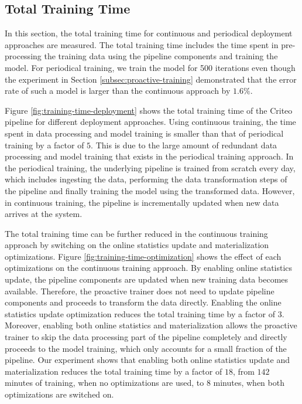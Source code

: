 \subsection{Total Training Time}
In this section, the total training time for continuous and periodical deployment approaches are measured.
The total training time includes the time spent in pre-processing the training data using the pipeline components and training the model.
For periodical training, we train the model for 500 iterations even though the experiment in Section \ref{subsec:proactive-training} demonstrated that the error rate of such a model is larger than the continuous approach by $1.6\%$.

Figure \ref{fig:training-time-deployment} shows the total training time of the Criteo pipeline for different deployment approaches.
Using continuous training, the time spent in data processing and model training is smaller than that of periodical training by a factor of $5$.
This is due to the large amount of redundant data processing and model training that exists in the periodical training approach.
In the periodical training, the underlying pipeline is trained from scratch every day, which includes ingesting the data, performing the data transformation steps of the pipeline and finally training the model using the transformed data.
However, in continuous training, the pipeline is incrementally updated when new data arrives at the system.

The total training time can be further reduced in the continuous training approach by switching on the online statistics update and materialization optimizations.
Figure \ref{fig:training-time-optimization} shows the effect of each optimizations on the continuous training approach.
By enabling online statistics update, the pipeline components are updated when new training data becomes available.
Therefore, the proactive trainer does not need to update pipeline components and proceeds to transform the data directly.
Enabling the online statistics update optimization reduces the total training time by a factor of $3$.
Moreover, enabling both online statistics and materialization allows the proactive trainer to skip the data processing part of the pipeline completely and directly proceeds to the model training, which only accounts for a small fraction of the pipeline.
Our experiment shows that enabling both online statistics update and materialization reduces the total training time by a factor of $18$, from $142$ minutes of training, when no optimizations are used, to $8$ minutes, when both optimizations are switched on.

